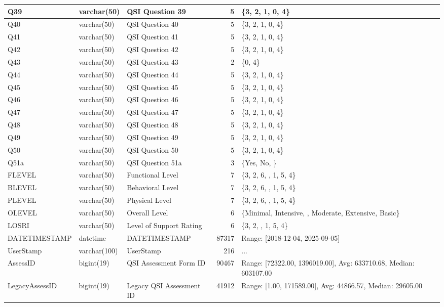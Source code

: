 \begin{landscape}
\begin{longtable}{|l|l|l|r|p{6cm}|}
\hline
Q39 & varchar(50) & QSI Question 39 & 5 & \{3, 2, 1, 0, 4\} \\
\hline
Q40 & varchar(50) & QSI Question 40 & 5 & \{3, 2, 1, 0, 4\} \\
\hline
Q41 & varchar(50) & QSI Question 41 & 5 & \{3, 2, 1, 0, 4\} \\
\hline
Q42 & varchar(50) & QSI Question 42 & 5 & \{3, 2, 1, 0, 4\} \\
\hline
Q43 & varchar(50) & QSI Question 43 & 2 & \{0, 4\} \\
\hline
Q44 & varchar(50) & QSI Question 44 & 5 & \{3, 2, 1, 0, 4\} \\
\hline
Q45 & varchar(50) & QSI Question 45 & 5 & \{3, 2, 1, 0, 4\} \\
\hline
Q46 & varchar(50) & QSI Question 46 & 5 & \{3, 2, 1, 0, 4\} \\
\hline
Q47 & varchar(50) & QSI Question 47 & 5 & \{3, 2, 1, 0, 4\} \\
\hline
Q48 & varchar(50) & QSI Question 48 & 5 & \{3, 2, 1, 0, 4\} \\
\hline
Q49 & varchar(50) & QSI Question 49 & 5 & \{3, 2, 1, 0, 4\} \\
\hline
Q50 & varchar(50) & QSI Question 50 & 5 & \{3, 2, 1, 0, 4\} \\
\hline
Q51a & varchar(50) & QSI Question 51a & 3 & \{Yes, No, \} \\
\hline
FLEVEL & varchar(50) & Functional Level & 7 & \{3, 2, 6, , 1, 5, 4\} \\
\hline
BLEVEL & varchar(50) & Behavioral Level & 7 & \{3, 2, 6, , 1, 5, 4\} \\
\hline
PLEVEL & varchar(50) & Physical Level & 7 & \{3, 2, 6, , 1, 5, 4\} \\
\hline
OLEVEL & varchar(50) & Overall Level & 6 & \{Minimal, Intensive, , Moderate, Extensive, Basic\} \\
\hline
LOSRI & varchar(50) & Level of Support Rating & 6 & \{3, 2, , 1, 5, 4\} \\
\hline
DATETIMESTAMP & datetime & DATETIMESTAMP & 87317 & Range: [2018-12-04, 2025-09-05] \\
\hline
UserStamp & varchar(100) & UserStamp & 216 & ... \\
\hline
AssessID & bigint(19) & QSI Assessment Form ID & 90467 & Range: [72322.00, 1396019.00], Avg: 633710.68, Median: 603107.00 \\
\hline
LegacyAssessID & bigint(19) & Legacy QSI Assessment ID & 41912 & Range: [1.00, 171589.00], Avg: 44866.57, Median: 29605.00 \\
\hline
\end{longtable}


\end{landscape}
